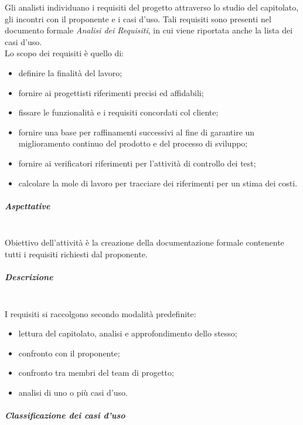 Gli analisti individuano i requisiti del progetto attraverso lo studio del 
capitolato, gli incontri con il proponente e i casi d'uso. Tali requisiti sono 
presenti nel documento formale \textit{Analisi dei Requisiti}, in cui viene riportata 
anche la lista dei casi d'uso. \\
Lo scopo dei requisiti è quello di:
	\begin{itemize}
		\item definire la finalità del lavoro;
		\item fornire ai progettisti riferimenti precisi ed affidabili;
		\item fissare le funzionalità e i requisiti concordati col cliente;
		\item fornire  una  base  per  raffinamenti  successivi  al  fine  di  
			garantire  un miglioramento continuo del prodotto e del processo di sviluppo;
		\item fornire ai verificatori riferimenti per l'attività di controllo dei 
			test;
		\item calcolare la mole di lavoro per tracciare dei riferimenti per un stima 
			dei costi.
	\end{itemize}
	
\subparagraph{Aspettative} \mbox{}\\

Obiettivo dell'attività è la creazione della documentazione formale 
contenente tutti i requisiti richiesti dal proponente. \newline \newline
			
\subparagraph{Descrizione} \mbox{}\\

I requisiti si raccolgono secondo modalità predefinite:
	\begin{itemize}
		\item lettura del capitolato\glo, analisi e approfondimento dello stesso;
		\item confronto con il proponente;
		\item confronto tra membri del team di progetto;
		\item analisi di uno o più casi d'uso.  \\
	\end{itemize}
	

\subparagraph{Classificazione dei casi d'uso} \mbox{}\\

